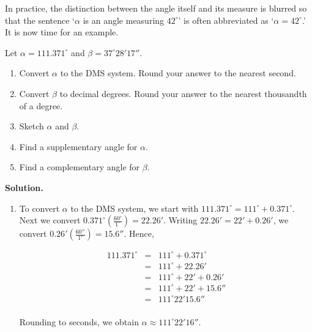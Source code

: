 \documentclass{ximera}
\begin{document}
In practice, the distinction between the angle itself and its measure is blurred so that the sentence `$\alpha$ is an angle measuring $42^{\circ}$' is often abbreviated as `$\alpha = 42^{\circ}$.'  It is now time for an example.

\begin{example} \label{degreeex}  Let $\alpha = 111.371^{\circ}$  and $\beta = 37^{\circ}28'17''$.

\begin{enumerate}

\item  Convert $\alpha$ to the DMS system.  Round your answer to the nearest second.

\item  Convert $\beta$ to decimal degrees.  Round your answer to the nearest thousandth of a degree.

\item  Sketch $\alpha$ and $\beta$.

\item  Find a supplementary angle for $\alpha$.

\item  Find a complementary angle for $\beta$.

\end{enumerate}

{\bf Solution.}

\begin{enumerate}

\item  To convert $\alpha$ to the DMS system, we start with $111.371^{\circ} = 111^{\circ}+ 0.371^{\circ}$.  Next we convert $0.371^{\circ} \left(\frac{60'}{1^{\circ}}\right) = 22.26'$.  Writing $22.26' = 22'+ 0.26'$, we convert $0.26' \left( \frac{60''}{1'} \right) = 15.6''$.  Hence,

\[ \begin{array}{rcl}

111.371^{\circ} & = & 111^{\circ} + 0.371^{\circ} \\
                & = & 111^{\circ} + 22.26' \\
                & = & 111^{\circ} + 22' + 0.26' \\
                & = & 111^{\circ} + 22' + 15.6'' \\
                & = & 111^{\circ}22'15.6'' \\ \end{array} \]

Rounding to seconds, we obtain $\alpha \approx 111^{\circ}22'16''$.


\end{enumerate}
\end{example}
\end{document}
